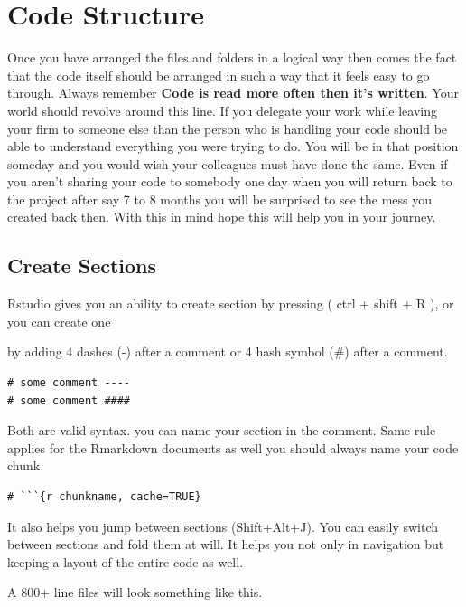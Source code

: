 \documentclass[
]{book}
\begin{document}
\hypertarget{code}{%
\chapter{Code Structure}\label{code}}

Once you have arranged the files and folders in a logical way then comes the fact that the code itself should be arranged in such a way that it feels easy to go through. Always remember \textbf{Code is read more often then it's written}. Your world should revolve around this line. If you delegate your work while leaving your firm to someone else than the person who is handling your code should be able to understand everything you were trying to do. You will be in that position someday and you would wish your colleagues must have done the same. Even if you aren't sharing your code to somebody one day when you will return back to the project after say 7 to 8 months you will be surprised to see the mess you created back then. With this in mind hope this will help you in your journey.

\hypertarget{create-sections}{%
\section{Create Sections}\label{create-sections}}

Rstudio gives you an ability to create section by pressing ( ctrl + shift + R ), or you can create one

by adding 4 dashes (-) after a comment or 4 hash symbol (\#) after a comment.

\begin{verbatim}
# some comment ----
# some comment ####
\end{verbatim}

Both are valid syntax. you can name your section in the comment. Same rule applies for the Rmarkdown documents as well you should always name your code chunk.

\begin{verbatim}
# ```{r chunkname, cache=TRUE}
\end{verbatim}

It also helps you jump between sections (Shift+Alt+J). You can easily switch between sections and fold them at will. It helps you not only in navigation but keeping a layout of the entire code as well.

A 800+ line files will look something like this.
\end{document}
